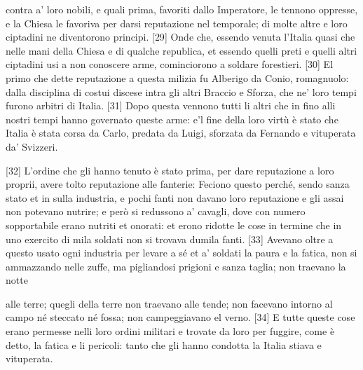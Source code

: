 \noindent{}contra a' loro nobili, e quali prima, favoriti dallo Imperatore,
le tennono oppresse, e la Chiesa le favoriva per darsi reputazione nel
temporale; di molte altre e loro ciptadini ne diventorono principi.
{[}29{]} Onde che, essendo venuta l'Italia quasi che nelle mani della
Chiesa e di qualche republica, et essendo quelli preti e quelli altri
ciptadini usi a non conoscere arme, cominciorono a soldare forestieri.
{[}30{]} El primo che dette reputazione a questa milizia fu Alberigo da
Conio, romagnuolo: dalla disciplina di costui discese intra gli altri
Braccio e Sforza, che ne' loro tempi furono arbitri di Italia. {[}31{]}
Dopo questa vennono tutti li altri che in fino alli nostri tempi hanno
governato queste arme: e'l fine della loro virtù è stato che Italia è
stata corsa da Carlo, predata da Luigi, sforzata da Fernando e
vituperata da' Svizzeri.

{[}32{]} L'ordine che gli hanno tenuto è stato prima, per dare
reputazione a loro proprii, avere tolto reputazione alle fanterie:
Feciono questo perché, sendo sanza stato et in sulla industria, e pochi
fanti non davano loro reputazione e gli assai non potevano nutrire; e
però si redussono a' cavagli, dove con numero sopportabile erano nutriti
et onorati: et erono ridotte le cose in termine che in uno exercito di
 mila soldati non si trovava dumila fanti. {[}33{]} Avevano oltre a
questo usato ogni industria per levare a sé et a' soldati la paura e la
fatica, non si ammazzando nelle zuffe, ma pigliandosi prigioni e sanza
taglia; non traevano la notte \linebreak

\quebra

\noindent{}alle terre; quegli della terre non
traevano alle tende; non facevano intorno al campo né steccato né fossa;
non campeggiavano el verno. {[}34{]} E tutte queste cose erano permesse
nelli loro ordini militari e trovate da loro per fuggire, come è detto,
la fatica e li pericoli: tanto che gli hanno condotta la Italia stiava e
vituperata.


